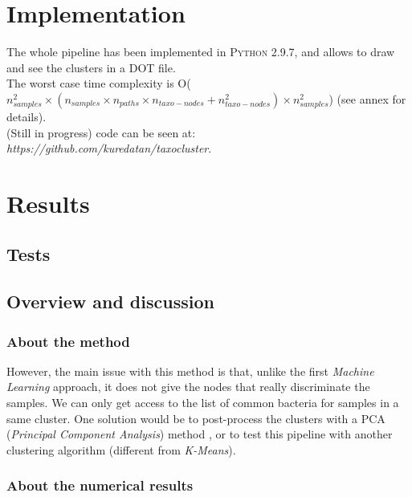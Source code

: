 \documentclass{report}
\begin{document}
\section{Implementation}

The whole pipeline has been implemented in \textsc{Python 2.9.7}, and allows to draw and see the clusters in a DOT file.\\

The worst case time complexity is O($n_{samples}^{2} \times (n_{samples} \times n_{paths} \times n_{taxo-nodes} + n_{taxo-nodes}^{2}) \times n_{samples}^{2}$) (see annex for details).\\

(Still in progress) code can be seen at: \\\emph{https://github.com/kuredatan/taxocluster}.

\section{Results}

\subsection{Tests}


\subsection{Overview and discussion}

\subsubsection{About the method}

However, the main issue with this method is that, unlike the first \emph{Machine Learning} approach, it does not give the nodes that really discriminate the samples. We can only get access to the list of common bacteria for samples in a same cluster. One solution would be to post-process the clusters with a \textsc{PCA} (\emph{Principal Component Analysis}) method \cite{PCA}, or to test this pipeline with another clustering algorithm (different from \emph{K-Means}).

\subsubsection{About the numerical results}

\end{document}
